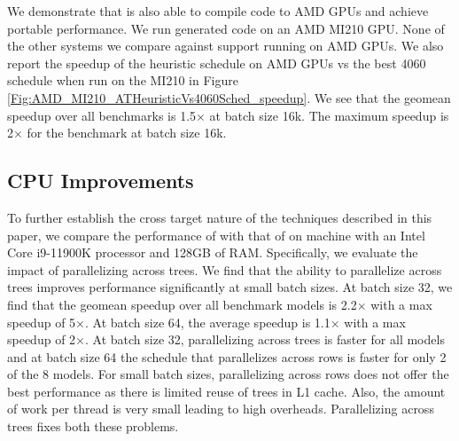We demonstrate that \Treebeard{} is also able to compile code to AMD GPUs and achieve portable performance. We run generated code on an AMD MI210 GPU. None of the other systems we compare against support running on AMD GPUs. We also report the speedup of the heuristic schedule on AMD GPUs vs the best 4060 schedule when run on the MI210 in Figure \ref{Fig:AMD_MI210_ATHeuristicVs4060Sched_speedup}. We see that the geomean speedup over all benchmarks is 1.5$\times$ at batch size 16k. The maximum speedup is 2$\times$ for the  benchmark at batch size 16k.

\subsection{CPU Improvements}
To further establish the cross target nature of the techniques described in this paper,
we compare the performance of \Treebeard{} with that of \TreebeardOLD{} on machine with an  
Intel Core i9-11900K processor and 128GB of RAM. Specifically, we evaluate the impact of parallelizing
across trees. We find that the ability to parallelize across trees improves performance 
significantly at small batch sizes. At batch size 32, we find that the geomean speedup over 
all benchmark models is 2.2$\times$ with a max speedup of 5$\times$. At batch size 64, the average speedup
is 1.1$\times$ with a max speedup of 2$\times$. At batch size 32, parallelizing across trees is faster 
for all models and at batch size 64 the \TreebeardOLD{} schedule that parallelizes across 
rows is faster for only 2 of the 8 models. For small batch sizes, parallelizing across rows does 
not offer the best performance as there is limited reuse of trees in L1 cache.
Also, the amount of work per thread is very small leading to high overheads. 
Parallelizing across trees fixes both these problems. 

